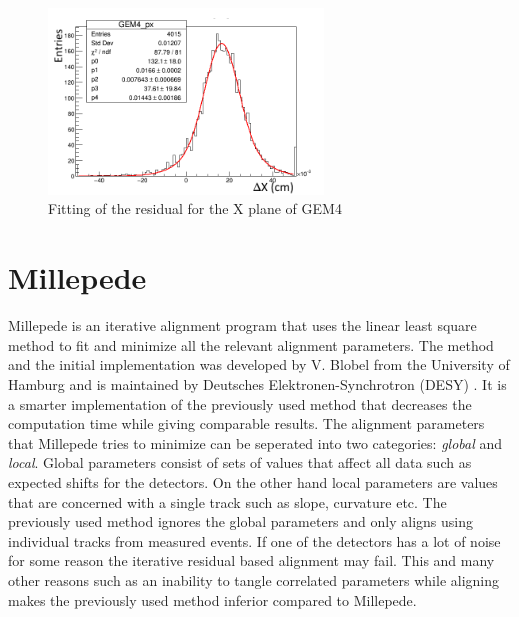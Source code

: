 \begin{figure}[t!]
\centering
\includegraphics[width=0.65\textwidth]{thesis_figures/alignment/Residual_GEM4X.png}
\caption{Fitting of the residual for the X plane of GEM4}
\label{fig:res_GEM4x}
\end{figure}
\section{Millepede}
Millepede is an iterative alignment program that uses the linear least square method to fit and minimize all the relevant alignment parameters. The method and the initial implementation was developed by V. Blobel from the University of Hamburg and is maintained by  Deutsches Elektronen-Synchrotron (DESY) \cite{Millepede}. It is a smarter implementation of the previously used method that decreases the computation time while giving comparable results. The alignment parameters that Millepede tries to minimize can be seperated into two categories: \textit{global} and \textit{local}. Global parameters consist of sets of values that affect all data such as expected shifts for the detectors. On the other hand local parameters are values that are concerned with a single track such as slope, curvature etc. The previously used method ignores the global parameters and only aligns using individual tracks from measured events. If one of the detectors has a lot of noise for some reason the iterative residual based alignment may fail. This and many other reasons such as an inability to tangle correlated parameters while aligning makes the previously used method inferior compared to Millepede.

